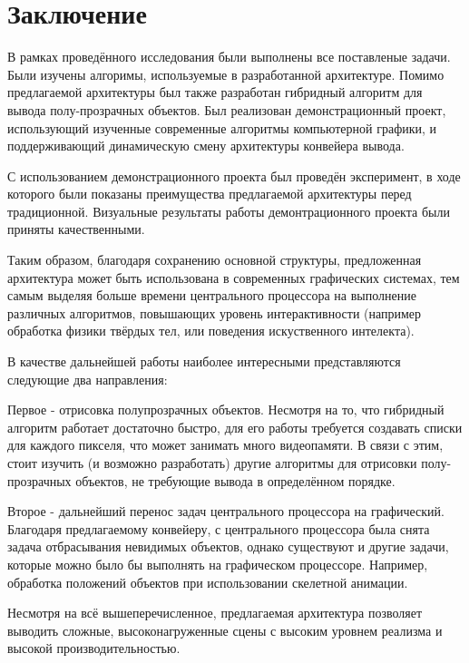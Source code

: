 \chapter*{Заключение} \label{ch-conclusion}
	В рамках проведённого исследования были выполнены все поставленые задачи. Были изучены алгоримы, используемые в разработанной архитектуре. Помимо предлагаемой архитектуры был также разработан гибридный алгоритм для вывода полу-прозрачных объектов. Был реализован демонстрационный проект, использующий изученные современные алгоритмы компьютерной графики, и поддерживающий динамическую смену архитектуры конвейера вывода.
	
	С использованием демонстрационного проекта был проведён эксперимент, в ходе которого были показаны преимущества предлагаемой архитектуры перед традиционной. Визуальные результаты работы демонтрационного проекта были приняты качественными.
	
	Таким образом, благодаря сохранению основной структуры, предложенная архитектура может быть использована в современных графических системах, тем самым выделяя больше времени центрального процессора на выполнение различных алгоритмов, повышающих уровень интерактивности (например обработка физики твёрдых тел, или поведения искуственного интелекта).
	
	В качестве дальнейшей работы наиболее интересными представляются следующие два направления: 	
	
	Первое - отрисовка полупрозрачных объектов. Несмотря на то, что гибридный алгоритм работает достаточно быстро, для его работы требуется создавать списки для каждого пикселя, что может занимать много видеопамяти. В связи с этим, стоит изучить (и возможно разработать) другие алгоритмы для отрисовки полу-прозрачных объектов, не требующие вывода в определённом порядке.

	Второе - дальнейший перенос задач центрального процессора на графический. Благодаря предлагаемому конвейеру, с центрального процессора была снята задача отбрасывания невидимых объектов, однако существуют и другие задачи, которые можно было бы выполнять на графическом процессоре. Например, обработка положений объектов при использовании скелетной анимации.
	
	Несмотря на всё вышеперечисленное, предлагаемая архитектура позволяет выводить сложные, высоконагруженные сцены с высоким уровнем реализма и высокой производительностью.